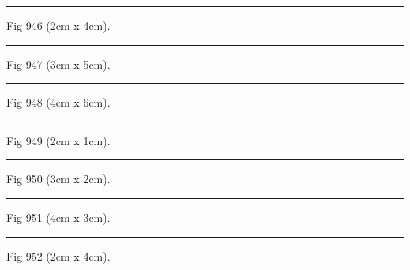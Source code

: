 \documentclass[a4paper,11pt]{article}
\begin{document}
\begin{swarmwrap}%
  \begin{minipage}[t]{2cm}
    \centering
    \rule{\linewidth}{4cm}
    {\footnotesize Fig 946 (2cm x 4cm).}
  \end{minipage}%
\end{swarmwrap}%
\swarmwrapnext
\lipsum[46]%

\begin{swarmwrap}%
  \begin{minipage}[t]{3cm}
    \centering
    \rule{\linewidth}{5cm}
    {\footnotesize Fig 947 (3cm x 5cm).}
  \end{minipage}%
\end{swarmwrap}%
\swarmwrapnext
\lipsum[47]%

\begin{swarmwrap}%
  \begin{minipage}[t]{4cm}
    \centering
    \rule{\linewidth}{6cm}
    {\footnotesize Fig 948 (4cm x 6cm).}
  \end{minipage}%
\end{swarmwrap}%
\swarmwrapnext
\lipsum[48]%

\begin{swarmwrap}%
  \begin{minipage}[t]{2cm}
    \centering
    \rule{\linewidth}{1cm}
    {\footnotesize Fig 949 (2cm x 1cm).}
  \end{minipage}%
\end{swarmwrap}%
\swarmwrapnext
\lipsum[49]%

\begin{swarmwrap}%
  \begin{minipage}[t]{3cm}
    \centering
    \rule{\linewidth}{2cm}
    {\footnotesize Fig 950 (3cm x 2cm).}
  \end{minipage}%
\end{swarmwrap}%
\swarmwrapnext
\lipsum[50]%

\begin{swarmwrap}%
  \begin{minipage}[t]{4cm}
    \centering
    \rule{\linewidth}{3cm}
    {\footnotesize Fig 951 (4cm x 3cm).}
  \end{minipage}%
\end{swarmwrap}%
\swarmwrapnext
\lipsum[51]%

\begin{swarmwrap}%
  \begin{minipage}[t]{2cm}
    \centering
    \rule{\linewidth}{4cm}
    {\footnotesize Fig 952 (2cm x 4cm).}
  \end{minipage}%
\end{swarmwrap}%
\swarmwrapnext
\lipsum[52]%
\end{document}
